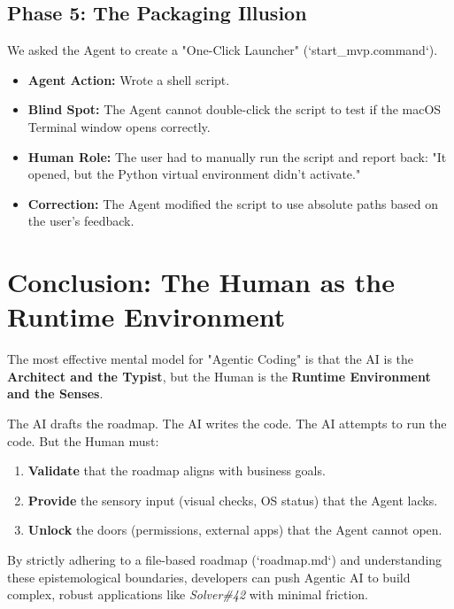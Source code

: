 \documentclass[12pt, a4paper]{article}
\begin{document}
\subsection{Phase 5: The Packaging Illusion}
We asked the Agent to create a "One-Click Launcher" (`start_mvp.command`).
\begin{itemize}
    \item \textbf{Agent Action:} Wrote a shell script.
    \item \textbf{Blind Spot:} The Agent cannot double-click the script to test if the macOS Terminal window opens correctly.
    \item \textbf{Human Role:} The user had to manually run the script and report back: "It opened, but the Python virtual environment didn't activate."
    \item \textbf{Correction:} The Agent modified the script to use absolute paths based on the user's feedback.
\end{itemize}

\section{Conclusion: The Human as the Runtime Environment}

The most effective mental model for "Agentic Coding" is that the AI is the \textbf{Architect and the Typist}, but the Human is the \textbf{Runtime Environment and the Senses}.

The AI drafts the roadmap. The AI writes the code. The AI attempts to run the code.
But the Human must:
\begin{enumerate}
    \item \textbf{Validate} that the roadmap aligns with business goals.
    \item \textbf{Provide} the sensory input (visual checks, OS status) that the Agent lacks.
    \item \textbf{Unlock} the doors (permissions, external apps) that the Agent cannot open.
\end{enumerate}

By strictly adhering to a file-based roadmap (`roadmap.md`) and understanding these epistemological boundaries, developers can push Agentic AI to build complex, robust applications like \textit{Solver\#42} with minimal friction.
\end{document}
